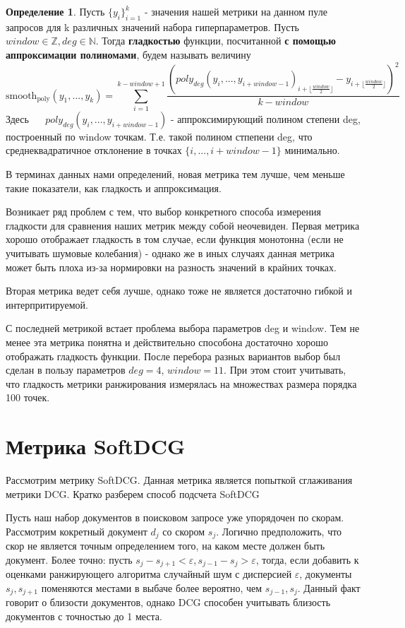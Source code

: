 \documentclass[12pt,a4paper]{amsart}
\theoremstyle{definition}
\newtheorem{definition}{Определение}[section]
\theoremstyle{definition}
\newcommand{\Sum}{\sum\limits}
\renewcommand\t{\text}
\renewcommand\b{\textbf}
\begin{document}
\begin{definition}
Пусть $\{y_i\}_{i=1}^k$ - значения нашей метрики на данном пуле запросов для k различных значений набора гиперпараметров. Пусть $window \in \mathbb{Z}, deg \in \mathbb{N}$. Тогда \b{гладкостью} функции, посчитанной \b{с помощью аппроксимации полиномами}, будем называть величину
$$\t{smooth}_\t{poly}(y_1,...,y_k) = \Sum_{i=1}^{k - window + 1} \frac{\left(poly_{deg}(y_i,...,y_{i + window - 1})_{i + \lfloor{\frac{window}{2}}\rfloor} - y_{i + \lfloor{\frac{window}{2}}\rfloor}\right)^2}{k - window}$$
Здесь ~~ $poly_{deg}(y_i,...,y_{i + window - 1})$ - аппроксимирующий полином степени deg, построенный по window точкам. Т.е. такой полином стпепени deg, что среднеквадратичное отклонение в точках $\{i,...,i + window - 1\}$ минимально.
\end{definition}

В терминах данных нами определений, новая метрика тем лучше, чем меньше такие показатели, как гладкость и аппроксимация.

Возникает ряд проблем с тем, что выбор конкретного способа измерения гладкости для сравнения наших метрик между собой неочевиден. Первая метрика хорошо отображает гладкость в том случае, если функция монотонна (если не учитывать шумовые колебания) - однако же в иных случаях данная метрика может быть плоха из-за нормировки на разность значений в крайних точках. 

Вторая метрика ведет себя лучше, однако тоже не является достаточно гибкой и интерпритируемой.

С последней метрикой встает проблема выбора параметров deg и window. Тем не менее эта метрика понятна и действительно способона достаточно хорошо отображать гладкость функции. После перебора разных вариантов выбор был сделан в пользу параметров ${deg = 4}$, ${window = 11}$. При этом стоит учитывать, что гладкость метрики ранжирования измерялась на множествах размера порядка 100 точек.


\newpage
\section{Метрика SoftDCG}

Рассмотрим  метрику SoftDCG. Данная метрика является попыткой сглаживания метрики DCG. Кратко разберем способ подсчета SoftDCG

Пусть наш набор документов в поисковом запросе уже упорядочен по скорам. Рассмотрим кокретный документ $d_j$ со скором $s_j$. Логично предположить, что скор не является точным определением того, на каком месте должен быть документ. Более точно: пусть ${s_j - s_{j + 1} < \varepsilon, s_{j - 1} - s_j > \varepsilon}$, тогда, если добавить к оценками ранжирующего алгоритма случайный шум с дисперсией $\varepsilon$, документы $s_j, s_{j+1}$ поменяются местами в выбаче более вероятно, чем $s_{j-1}, s_j$. Данный факт говорит о близости документов, однако DCG способен учитывать близость документов с точностью до 1 места.
\end{document}
